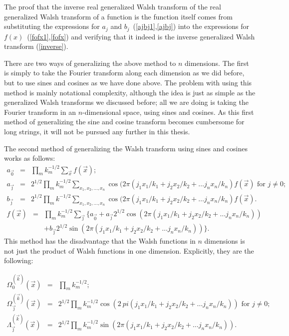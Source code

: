 The proof that the inverse real generalized Walsh transform of the
real generalized Walsh transform of a function is the function itself
comes from substituting the expressions
for $a_j$ and $b_j$~(\ref{ajbj1},\ref{ajbj}) into the expressions for
$f(x)$~(\ref{fofx1},\ref{fofx})
and verifying that it
indeed is the inverse generalized Walsh transform (\ref{inverse}).

There are two ways of generalizing the above method to $n$ dimensions.
The first is simply to take the Fourier transform along each dimension
as we did before, but to use sines and cosines as we have done above.
The problem with using this method is mainly notational complexity,
although the idea is just as simple
as the generalized Walsh transforms we discussed before;  all we are
doing is taking the Fourier transform in an $n$-dimensional space, using
sines and cosines.
As this first method of generalizing the sine and cosine transform becomes
cumbersome for long strings, it will not be pursued any further in this
thesis.

The second method of generalizing the Walsh
transform using sines and cosines works as follows:
\begin{eqnarray}
a_{\vec{0}} &=& \prod_m{k_m^{-1/2}} \sum_{\vec{x}} {f(\vec{x})}; \nonumber\\
a_{\vec{\jmath}} &=& 2^{1/2} \prod_m{k_m^{-1/2}} \sum_{x_1,x_2,\ldots,x_n}
        {\cos(2 \pi (j_1 x_1/k_1+j_2 x_2/k_2+\ldots j_n x_n/k_n)
        f(\vec{x})}
        \mbox{\ for $j\ne 0$};\nonumber \\
b_{\vec{\jmath}} &=& 2^{1/2} \prod_m{k^{-1/2}} \sum_{x_1,x_2,\ldots,x_n}
        {\cos(2 \pi (j_1 x_1/k_1+j_2 x_2/k_2+\ldots j_n x_n/k_n)
        f(\vec{x})}.
\end{eqnarray}
\begin{eqnarray}
f(\vec{x}) &=& \prod_m{k_m^{-1/2}} \sum_{\vec{\jmath}}
{}\{
a_{\vec 0}+
a_{\vec{\jmath}} 2^{1/2} \cos(2 \pi (j_1 x_1/k_1+j_2 x_2/k_2+\ldots j_n x_n/k_n)
)
        \nonumber\\
&& +
b_{\vec{\jmath}} 2^{1/2} \sin(2 \pi (j_1 x_1/k_1+j_2 x_2/k_2+\ldots j_n x_n/k_n)
)
\}.
\end{eqnarray}
This method has the disadvantage that the Walsh functions in $n$
dimensions is not just the product of Walsh functions in one dimension.
Explicitly, they are the following:
\begin{definition}
\begin{eqnarray}
\Omega^{(\vec k)}_0(\vec x) &=& \prod_m{k_m^{-1/2}};\nonumber\\
\Omega^{(\vec k)}_{\vec{\jmath}}(\vec x) &=& 2^{1/2}\prod_m{k_m^{-1/2}} \cos(2 \
pi (j_1 x_1/k_1 +
        j_2 x_2/k_2 + \ldots j_n x_n /k_n)) \mbox{\ for $j\ne 0$};\nonumber\\
\Lambda^{(\vec k)}_{\vec{\jmath}}(\vec x) &=& 2^{1/2}\prod_m{k_m^{-1/2}} \sin(2
\pi (j_1 x_1/k_1 +
        j_2 x_2/k_2 + \ldots j_n x_n /k_n)).
\end{eqnarray}
\end{definition}


